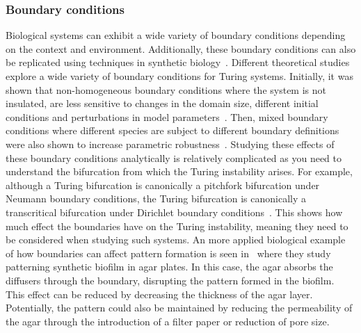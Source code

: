 \subsubsection{Boundary conditions}\label{boundary_conditions_intro}
Biological systems can exhibit a wide variety of boundary conditions depending on the context and environment.
Additionally, these boundary conditions can also be replicated using techniques in synthetic biology~\parencite{Krause2020, Sheth2012, Vahey2014}.
Different theoretical studies explore a wide variety of boundary conditions for Turing systems.
Initially, it was shown that non-homogeneous boundary conditions where the system is not insulated, are less sensitive to changes in the domain size, different initial conditions and perturbations in model parameters~\parencite{Arcuri1986}.
Then, mixed boundary conditions where different species are subject to different boundary definitions were also shown to increase parametric robustness~\parencite{Maini1993, Maini1997, Krause2021}.
Studying these effects of these boundary conditions analytically is relatively complicated as you need to understand the bifurcation from which the Turing instability arises.
For example, although a Turing bifurcation is canonically a pitchfork bifurcation under Neumann boundary conditions, the Turing bifurcation is canonically a transcritical bifurcation under Dirichlet boundary conditions~\parencite{Woolley2022}. %
This shows how much effect the boundaries have on the Turing instability, meaning they need to be considered when studying such systems.
An more applied biological example of how boundaries can affect pattern formation is seen in~\parencite{Krause2020} where they study patterning synthetic biofilm in agar plates.
In this case, the agar absorbs the diffusers through the boundary, disrupting the pattern formed in the biofilm.
This effect can be reduced by decreasing the thickness of the agar layer.
Potentially, the pattern could also be maintained by reducing the permeability of the agar through the introduction of a filter paper or reduction of pore size.


%






